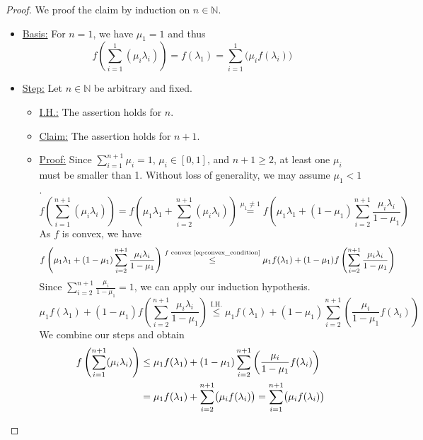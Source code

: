 \begin{proof}
We proof the claim by induction on $n\in\mathbb{N}$.
\begin{itemize}
\item\underline{Basis:} For $n=1$, we have $\mu_1=1$ and thus
\begin{equation*}
	f\left(\sum\limits_{i=1}^1(\mu_i\lambda_i)\right)=f(\lambda_1)=\sum\limits_{i=1}^1\bigl(\mu_if(\lambda_i)\bigr)
\end{equation*}
\item\underline{Step:} Let $n\in\mathbb{N}$ be arbitrary and fixed.
\begin{itemize}
	\item\underline{I.H.:} The assertion holds for $n$.
	\item\underline{Claim:} The assertion holds for $n+1$.
	\item\underline{Proof:} Since $\sum\limits_{i=1}^{n+1}\mu_i=1$, $\mu_i\in[0,1]$, and $n+1\ge 2$, at least one $\mu_i$ must be smaller than 1. Without loss of generality, we may assume $\mu_1<1$.
	\begin{equation*}
		f\left(\sum\limits_{i=1}^{n+1}(\mu_i\lambda_i)\right)=f\left(\mu_1\lambda_1+\sum\limits_{i=2}^{n+1}(\mu_i\lambda_i)\right)\stackrel{\mu_1\neq1}{=}f\left(\mu_1\lambda_1+(1-\mu_1)\sum\limits_{i=2}^{n+1}\frac{\mu_i\lambda_i}{1-\mu_1}\right)
	\end{equation*}
	As $f$ is convex, we have
	\begin{equation*}
		f\left(\mu_1\lambda_1+(1-\mu_1)\sum\limits_{i=2}^{n+1}\frac{\mu_i\lambda_i}{1-\mu_1}\right)\stackrel{f\text{ convex~\eqref{eq:convex_condition}}}{\le} \mu_1f(\lambda_1)+(1-\mu_1)f\left(\sum\limits_{i=2}^{n+1}\frac{\mu_i\lambda_i}{1-\mu_1}\right)
	\end{equation*}
	Since $\sum\limits_{i=2}^{n+1}\frac{\mu_i}{1-\mu_1}=1$, we can apply our induction hypothesis.
	\begin{equation*}
		\mu_1f(\lambda_1)+(1-\mu_1)f\left(\sum\limits_{i=2}^{n+1}\frac{\mu_i\lambda_i}{1-\mu_1}\right)\stackrel{\text{I.H.}}{\le} \mu_1f(\lambda_1)+(1-\mu_1)\sum\limits_{i=2}^{n+1}\left(\frac{\mu_i}{1-\mu_1}f(\lambda_i)\right)
	\end{equation*}
	We combine our steps and obtain
	\begin{align*}
		f\left(\sum\limits_{i=1}^{n+1}(\mu_i\lambda_i)\right)&\le \mu_1f(\lambda_1)+(1-\mu_1)\sum\limits_{i=2}^{n+1}\left(\frac{\mu_i}{1-\mu_1}f(\lambda_i)\right)\\
		&=\mu_1f(\lambda_1)+\sum\limits_{i=2}^{n+1}\bigl(\mu_if(\lambda_i)\bigr)=\sum_{i=1}^{n+1}\bigl(\mu_i f(\lambda_i)\bigr)\qedhere
	\end{align*}
\end{itemize}
\end{itemize}
\end{proof}
